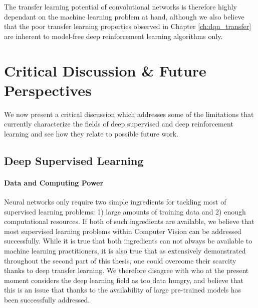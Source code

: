 \begin{enumerate}
The transfer learning potential of convolutional networks is therefore highly dependant on the machine learning problem at hand, although we also believe that the poor transfer learning properties observed in Chapter \ref{ch:dqn_transfer} are inherent to model-free deep reinforcement learning algorithms only.


\end{enumerate}


\section{Critical Discussion \& Future Perspectives}
\label{sec:critical_discussion}

We now present a critical discussion which addresses some of the limitations that currently characterize the fields of deep supervised and deep reinforcement learning and see how they relate to possible future work.

\subsection{Deep Supervised Learning}
\label{sec:supervised_learning}

\paragraph{\textbf{\uppercase{D}ata and \uppercase{C}omputing \uppercase{P}ower}}
Neural networks only require two simple ingredients for tackling most of supervised learning problems: 1) large amounts of training data and 2) enough computational resources. If both of such ingredients are available, we believe that most supervised learning problems within Computer Vision can be addressed successfully. While it is true that both ingredients can not always be available to machine learning practitioners, it is also true that as extensively demonstrated throughout the second part of this thesis, one could overcome their scarcity thanks to deep transfer learning. We therefore disagree with \citet{marcus2018deep} who at the present moment considers the deep learning field as too data hungry, and believe that this is an issue that thanks to the availability of large pre-trained models has been successfully addressed.  

